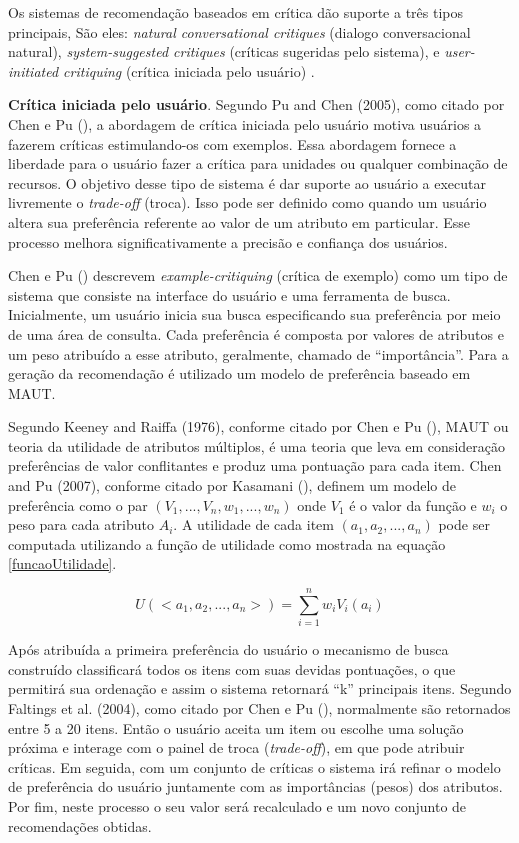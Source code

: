 Os sistemas de recomendação baseados em crítica dão suporte a três tipos principais, São eles: \textit{natural conversational critiques} (dialogo conversacional natural), \textit{system-suggested critiques} (críticas sugeridas pelo sistema), e \textit{user-initiated critiquing} (crítica iniciada pelo usuário) \cite{Chen:2012}.

\textbf{Crítica iniciada pelo usuário}. Segundo Pu and Chen (2005), como citado por Chen e Pu (\citeyear{Chen:2012}), a abordagem de crítica iniciada pelo usuário motiva usuários a fazerem críticas estimulando-os com exemplos. Essa abordagem fornece a liberdade para o usuário fazer a crítica para unidades ou qualquer combinação de recursos. O objetivo desse tipo de sistema é dar suporte ao usuário a executar livremente o \textit{trade-off} (troca). Isso pode ser definido como quando um usuário altera sua preferência referente ao valor de um atributo em particular. Esse processo melhora significativamente a precisão e confiança dos usuários.

Chen e Pu (\citeyear{Chen:2012}) descrevem \textit{example-critiquing} (crítica de exemplo) como um tipo de sistema que consiste na interface do usuário e uma ferramenta de busca. Inicialmente, um usuário inicia sua busca especificando sua preferência por meio de uma área de consulta. Cada preferência é composta por valores de atributos e um peso atribuído a esse atributo, geralmente, chamado de “importância”. Para a geração da recomendação é utilizado um modelo de preferência baseado em MAUT.

Segundo Keeney and Raiffa (1976), conforme citado por Chen e Pu (\citeyear{Chen:2012}), MAUT ou teoria da utilidade de atributos múltiplos, é uma teoria que leva em consideração preferências de valor conflitantes e produz uma pontuação para cada item. Chen and Pu (2007), conforme citado por Kasamani (\citeyear{Kasamani:2017}), definem um modelo de preferência como o par \((V_1, ..., V_n, w_1, ..., w_n)\) onde \(V_1\) é o valor da função e \(w_i\) o peso para cada atributo \(A_i\). A utilidade de cada item \((a_1, a_2, ..., a_n)\) pode ser computada utilizando a função de utilidade como mostrada na equação \eqref{funcaoUtilidade}.

\begin{equation}
    \label{funcaoUtilidade}
    U(<a_1,a_2,...,a_n>)=\sum_{i=1}^{n} w_i V_i(a_i)
\end{equation}

Após atribuída a primeira preferência do usuário o mecanismo de busca construído classificará todos os itens com suas devidas pontuações, o que permitirá sua ordenação e assim o sistema retornará “k” principais itens. Segundo Faltings et al. (2004), como citado por Chen e Pu (\citeyear{Chen:2012}), normalmente são retornados entre 5 a 20 itens. Então o usuário aceita um item ou escolhe uma solução próxima e interage com o painel de troca (\textit{trade-off}), em que pode atribuir críticas. Em seguida, com um conjunto de críticas o sistema irá refinar o modelo de preferência do usuário juntamente com as importâncias (pesos) dos atributos. Por fim, neste processo o seu valor será recalculado e um novo conjunto de recomendações obtidas.


